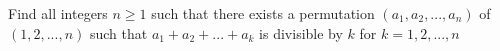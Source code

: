 Find all integers $n\geq 1$ such that there exists a permutation $(a_1,a_2,...,a_n)$ of $(1,2,...,n)$ such that $a_1+a_2+...+a_k$ is divisible by $k$ for $k=1,2,...,n$